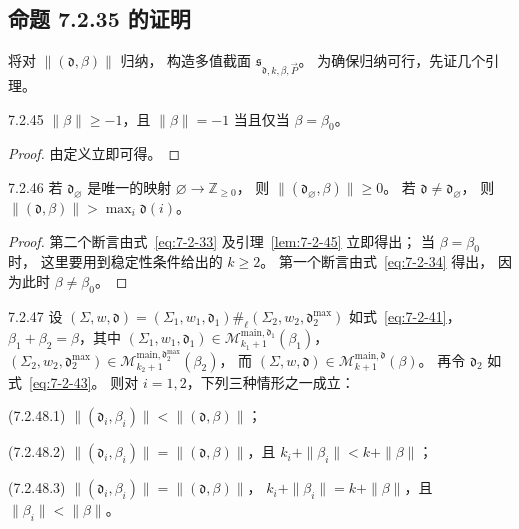 
\subsection{命题 7.2.35 的证明}
\label{subsec:7-2-5}

将对 $\|(\mathfrak d,\beta)\|$ 归纳，
构造多值截面
$\mathfrak s_{\mathfrak d,k,\beta,\vec P}$。
为确保归纳可行，先证几个引理。

\begin{lemma}{7.2.45}\label{lem:7-2-45}
$\|\beta\|\ge-1$，且
$\|\beta\|=-1$ 当且仅当 $\beta=\beta_0$。
\end{lemma}
\begin{proof}
由定义立即可得。
\end{proof}

\begin{lemma}{7.2.46}\label{lem:7-2-46}
若 $\mathfrak d_\varnothing$ 是唯一的映射
$\varnothing\to\mathbb Z_{\ge0}$，
则 $\|(\mathfrak d_\varnothing,\beta)\|\ge0$。
若 $\mathfrak d\ne\mathfrak d_\varnothing$，
则 $\|(\mathfrak d,\beta)\|>
\max_i\mathfrak d(i)$。
\end{lemma}
\begin{proof}
第二个断言由式~\eqref{eq:7-2-33}
及引理~\ref{lem:7-2-45} 立即得出；
当 $\beta=\beta_0$ 时，
这里要用到稳定性条件给出的 $k\ge2$。
第一个断言由式~\eqref{eq:7-2-34} 得出，
因为此时 $\beta\ne\beta_0$。
\end{proof}

\begin{lemma}{7.2.47}\label{lem:7-2-47}
设
$(\Sigma,w,\mathfrak d)
=(\Sigma_1,w_1,\mathfrak d_1)
\mathbin{\#_\ell}
(\Sigma_2,w_2,\mathfrak d_2^{\max})$
如式~\eqref{eq:7-2-41}，
$\beta_1+\beta_2=\beta$，其中
$(\Sigma_1,w_1,\mathfrak d_1)
\in\mathcal M^{\mathrm{main},\mathfrak d_1}_{k_1+1}(\beta_1)$，
$(\Sigma_2,w_2,\mathfrak d_2^{\max})
\in\mathcal M^{\mathrm{main},\mathfrak d_2^{\max}}_{k_2+1}(\beta_2)$，
而 $(\Sigma,w,\mathfrak d)
\in\mathcal M^{\mathrm{main},\mathfrak d}_{k+1}(\beta)$。
再令 $\mathfrak d_2$ 如式~\eqref{eq:7-2-43}。
则对 $i=1,2$，下列三种情形之一成立：

\noindent\textup{(7.2.48.1)}\quad
$\|(\mathfrak d_i,\beta_i)\|
<\|(\mathfrak d,\beta)\|$；

\noindent\textup{(7.2.48.2)}\quad
$\|(\mathfrak d_i,\beta_i)\|
=\|(\mathfrak d,\beta)\|$，且
$k_i+\|\beta_i\|<k+\|\beta\|$；

\noindent\textup{(7.2.48.3)}\quad
$\|(\mathfrak d_i,\beta_i)\|
=\|(\mathfrak d,\beta)\|$，
$k_i+\|\beta_i\|=k+\|\beta\|$，且
$\|\beta_i\|<\|\beta\|$。
\end{lemma}

